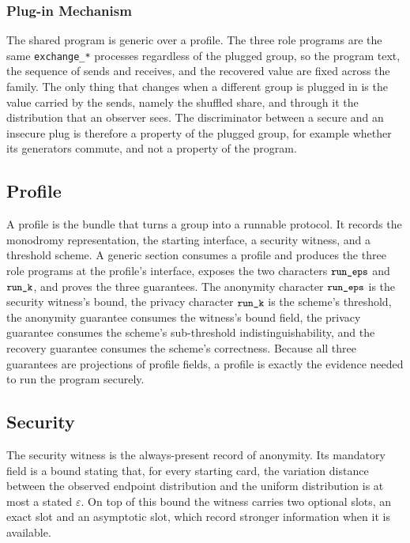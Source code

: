 \documentclass[a4paper,11pt]{article}
\newcommand{\id}[1]{\texttt{\small #1}}
\begin{document}
\subsubsection{Plug-in Mechanism}

The shared program is generic over a profile. The three role programs are the
same \id{exchange\_*} processes regardless of the plugged group, so the program
text, the sequence of sends and receives, and the recovered value are fixed
across the family. The only thing that changes when a different group is plugged
in is the value carried by the sends, namely the shuffled share, and through it
the distribution that an observer sees. The discriminator between a secure and
an insecure plug is therefore a property of the plugged group, for example
whether its generators commute, and not a property of the program.

\subsection{Profile}

A profile is the bundle that turns a group into a runnable protocol. It records
the monodromy representation, the starting interface, a security witness, and a
threshold scheme. A generic section consumes a profile and produces the three
role programs at the profile's interface, exposes the two characters
$\id{run\_eps}$ and $\id{run\_k}$, and proves the three guarantees. The
anonymity character $\id{run\_eps}$ is the security witness's bound, the privacy
character $\id{run\_k}$ is the scheme's threshold, the anonymity guarantee
consumes the witness's bound field, the privacy guarantee consumes the scheme's
sub-threshold indistinguishability, and the recovery guarantee consumes the
scheme's correctness. Because all three guarantees are projections of profile
fields, a profile is exactly the evidence needed to run the program securely.

\subsection{Security}

The security witness is the always-present record of anonymity. Its mandatory
field is a bound stating that, for every starting card, the variation distance
between the observed endpoint distribution and the uniform distribution is at
most a stated $\varepsilon$. On top of this bound the witness carries two
optional slots, an exact slot and an asymptotic slot, which record stronger
information when it is available.
\end{document}
